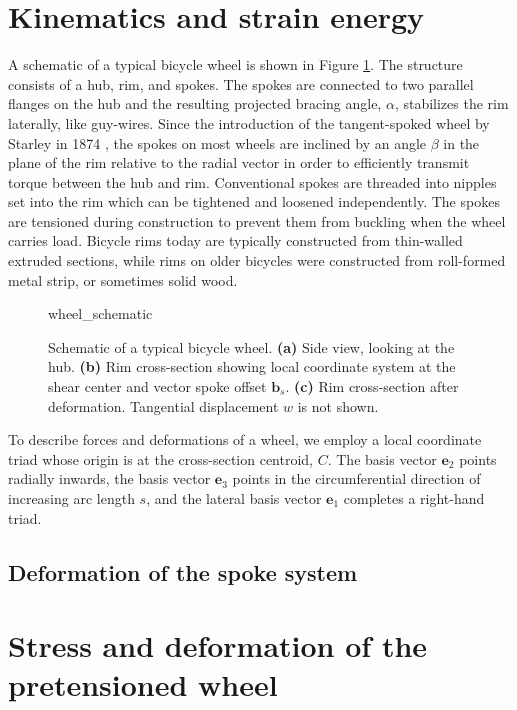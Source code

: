 \documentclass[\rootdir/thesis.tex]{subfiles}
\begin{document}
\section{Kinematics and strain energy}
A schematic of a typical bicycle wheel is shown in Figure \ref{fig:wheel_schematic}. The structure consists of a hub, rim, and spokes. The spokes are connected to two parallel flanges on the hub and the resulting projected bracing angle, $\alpha$, stabilizes the rim laterally, like guy-wires. Since the introduction of the tangent-spoked wheel by Starley in 1874 \cite{Hadland2014}, the spokes on most wheels are inclined by an angle $\beta$ in the plane of the rim relative to the radial vector in order to efficiently transmit torque between the hub and rim. Conventional spokes are threaded into nipples set into the rim which can be tightened and loosened independently. The spokes are tensioned during construction to prevent them from buckling when the wheel carries load. Bicycle rims today are typically constructed from thin-walled extruded sections, while rims on older bicycles were constructed from roll-formed metal strip, or sometimes solid wood.

\begin{figure}[h]
\centering
{wheel_schematic}
\caption{Schematic of a typical bicycle wheel. \textbf{(a)} Side view, looking at the hub. \textbf{(b)} Rim cross-section showing local coordinate system at the shear center and vector spoke offset $\mathbf{b}_s$. \textbf{(c)} Rim cross-section after deformation. Tangential displacement $w$ is not shown.}
\label{fig:wheel_schematic}
\end{figure}

To describe forces and deformations of a wheel, we employ a local coordinate triad whose origin is at the cross-section centroid, $C$. The basis vector $\mathbf{e}_2$ points radially inwards, the basis vector $\mathbf{e}_3$ points in the circumferential direction of increasing arc length $s$, and the lateral basis vector $\mathbf{e}_1$ completes a right-hand triad.



\subsection{Deformation of the spoke system}



\section{Stress and deformation of the pretensioned wheel}
\label{sec:radial_bulging}

\end{document}
